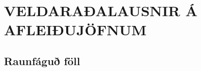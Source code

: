 \newenvironment{se}{\begin{setning+}\sl}{\hfill$\square$\end{setning+}\rm}
\newenvironment{sex}{\begin{setning+}\sl}{\hfill$\blacksquare$\end{setning+}\rm}
\newenvironment{sk}{\begin{skilgreining+}\rm}{\hfill$\square$\end{skilgreining+}\rm}
\newenvironment{sesk}{\begin{setningogskilgreining+}\rm}{\hfill$\square$\end{setningogskilgreining+}\rm}
\newenvironment{hs}{\begin{hjalparsetning+}\sl}{\hfill$\square$\end{hjalparsetning+}\rm}
\newenvironment{fs}{\begin{fylgisetning+}\sl}{\hfill$\square$\end{fylgisetning+}\rm}
\newenvironment{sy}{\begin{synidaemi+}\rm}{\hfill$\square$\end{synidaemi+}\rm}
\newenvironment{fo}{\begin{forrit+}\rm}{\hfill\end{forrit+}\rm}
\newenvironment{so}{\medbreak\noindent{\it Sönnun:}\rm}{\hfill$\blacksquare$\rm}
\newenvironment{sotx}[1]{\medbreak\noindent{\it #1:}\rm}{\hfill$\blacksquare$\rm}
\newcommand{\aefing}{\section{Æfingardæmi} \setcounter{daemateljari}{1}}
\newcommand{\daemi}{
{\medskip\noindent{\bf \thedaemateljari.}}
\addtocounter{daemateljari}{1}
}

\def\svar#1{\smallskip\noindent{\bf #1.} \ }
\def\lausn#1{\smallskip\noindent{\bf #1.} \ }
\def\ugrein#1{\medbreak\noindent{\bf #1.} }
\newcommand{\samantekt}{\noindent{\bf Samantekt.} }


\chapter
{VELDARAÐALAUSNIR Á AFLEIÐUJÖFNUM}
 

\section{Raunfáguð föll}


